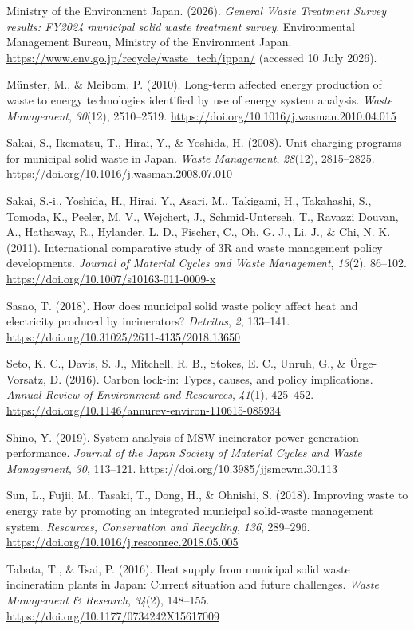 \documentclass[12pt,letterpaper]{article}
\begin{document}
Ministry of the Environment Japan. (2026). \textit{General Waste Treatment
Survey results: FY2024 municipal solid waste treatment survey}. Environmental
Management Bureau, Ministry of the Environment Japan.
\url{https://www.env.go.jp/recycle/waste_tech/ippan/} (accessed 10 July 2026).

M\"{u}nster, M., \& Meibom, P. (2010). Long-term affected energy production of
waste to energy technologies identified by use of energy system analysis.
\textit{Waste Management}, \textit{30}(12), 2510--2519.
\url{https://doi.org/10.1016/j.wasman.2010.04.015}

Sakai, S., Ikematsu, T., Hirai, Y., \& Yoshida, H. (2008). Unit-charging
programs for municipal solid waste in Japan. \textit{Waste Management},
\textit{28}(12), 2815--2825.
\url{https://doi.org/10.1016/j.wasman.2008.07.010}

Sakai, S.-i., Yoshida, H., Hirai, Y., Asari, M., Takigami, H., Takahashi, S.,
Tomoda, K., Peeler, M. V., Wejchert, J., Schmid-Unterseh, T., Ravazzi Douvan,
A., Hathaway, R., Hylander, L. D., Fischer, C., Oh, G. J., Li, J., \& Chi, N. K.
(2011). International comparative study of 3R and waste management policy
developments. \textit{Journal of Material Cycles and Waste Management},
\textit{13}(2), 86--102.
\url{https://doi.org/10.1007/s10163-011-0009-x}

Sasao, T. (2018). How does municipal solid waste policy affect heat and
electricity produced by incinerators? \textit{Detritus}, \textit{2}, 133--141.
\url{https://doi.org/10.31025/2611-4135/2018.13650}

Seto, K. C., Davis, S. J., Mitchell, R. B., Stokes, E. C., Unruh, G., \&
\"{U}rge-Vorsatz, D. (2016). Carbon lock-in: Types, causes, and policy
implications. \textit{Annual Review of Environment and Resources},
\textit{41}(1), 425--452.
\url{https://doi.org/10.1146/annurev-environ-110615-085934}

Shino, Y. (2019). System analysis of MSW incinerator power generation
performance. \textit{Journal of the Japan Society of Material Cycles and Waste
Management}, \textit{30}, 113--121.
\url{https://doi.org/10.3985/jjsmcwm.30.113}

Sun, L., Fujii, M., Tasaki, T., Dong, H., \& Ohnishi, S. (2018). Improving
waste to energy rate by promoting an integrated municipal solid-waste
management system. \textit{Resources, Conservation and Recycling},
\textit{136}, 289--296.
\url{https://doi.org/10.1016/j.resconrec.2018.05.005}

Tabata, T., \& Tsai, P. (2016). Heat supply from municipal solid waste
incineration plants in Japan: Current situation and future challenges.
\textit{Waste Management \& Research}, \textit{34}(2), 148--155.
\url{https://doi.org/10.1177/0734242X15617009}
\end{document}
